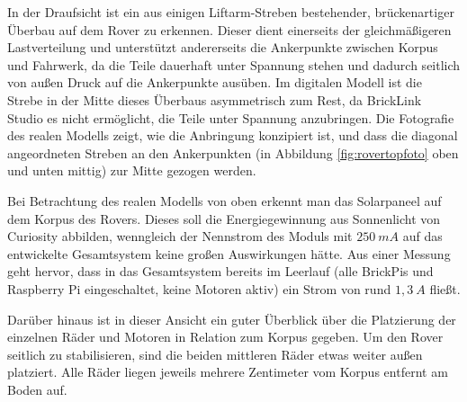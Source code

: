 In der Draufsicht ist ein aus einigen Liftarm-Streben bestehender, brückenartiger Überbau auf dem Rover zu erkennen.
Dieser dient einerseits der gleichmäßigeren Lastverteilung und unterstützt andererseits die Ankerpunkte zwischen Korpus und Fahrwerk, da die Teile dauerhaft unter Spannung stehen und dadurch seitlich von außen Druck auf die Ankerpunkte ausüben.
Im digitalen Modell ist die Strebe in der Mitte dieses Überbaus asymmetrisch zum Rest, da BrickLink Studio es nicht ermöglicht, die Teile unter Spannung anzubringen.
Die Fotografie des realen Modells zeigt, wie die Anbringung konzipiert ist, und dass die diagonal angeordneten Streben an den Ankerpunkten (in Abbildung \ref{fig:rovertopfoto} oben und unten mittig) zur Mitte gezogen werden.

Bei Betrachtung des realen Modells von oben erkennt man das Solarpaneel auf dem Korpus des Rovers.
Dieses soll die Energiegewinnung aus Sonnenlicht von Curiosity abbilden, wenngleich der Nennstrom des Moduls mit $250\ mA$ auf das entwickelte Gesamtsystem keine großen Auswirkungen hätte.
Aus einer Messung geht hervor, dass in das Gesamtsystem bereits im Leerlauf (alle BrickPis und Raspberry Pi eingeschaltet, keine Motoren aktiv) ein Strom von rund $1,3\ A$ fließt.

Darüber hinaus ist in dieser Ansicht ein guter Überblick über die Platzierung der einzelnen Räder und Motoren in Relation zum Korpus gegeben.
Um den Rover seitlich zu stabilisieren, sind die beiden mittleren Räder etwas weiter außen platziert.
Alle Räder liegen jeweils mehrere Zentimeter vom Korpus entfernt am Boden auf.